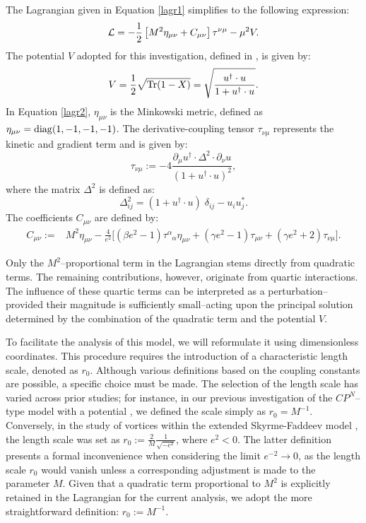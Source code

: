 \documentclass[aps,prd,superscriptaddress,notitlepage,11pt,final,longbibliography,nofootinbib]{revtex4-1}
\newcommand{\be}{\begin{equation}}
\newcommand{\ee}{\end{equation}}
\numberwithin{equation}{section}
\begin{document}
The Lagrangian given in Equation \eqref{lagr1} simplifies to the following expression:
\be
{\cal L}=-\frac{1}{2}\left[M^2\eta_{\mu\nu}+C_{\mu\nu}\right]\tau^{\nu\mu}-\mu^2V.\label{lagr2}
\ee
The potential $V$ adopted for this investigation, defined in \cite{Klimas:2017eft}, is given by:
\be
V=\frac{1}{2}\sqrt{{\rm Tr}(1-X)}=\sqrt{\frac{u^{\dagger}\cdot u}{1+u^{\dagger}\cdot u}}.\label{potencjal}
\ee
In Equation \eqref{lagr2}, $\eta_{\mu\nu}$ is the Minkowski metric, defined as $\eta_{\mu\nu}={\rm diag}(1,-1,-1,-1)$. The derivative-coupling tensor $\tau_{\nu\mu}$ represents the kinetic and gradient term and is given by:
\be
\tau_{\nu\mu}:=-4\frac{\partial_{\mu}u^{\dagger}\cdot\Delta^2\cdot\partial_{\nu}u}{(1+u^{\dagger}\cdot u)^2},\label{tau}
\ee
where the matrix $\Delta^2$ is defined as:
\[
\Delta^2_{ij}=(1+u^{\dagger} \cdot u)\;\delta_{ij}-u_iu^*_j.
\]
The coefficients $C_{\mu\nu}$ are defined by:
\begin{align}
C_{\mu\nu}:=&M^2\eta_{\mu\nu}-\frac{4}{e^2}\Big[(\beta e^2-1)\tau^{\alpha}_{\,\,\,\,\alpha}\eta_{\mu\nu}+(\gamma e^2-1)\tau_{\mu\nu}+(\gamma e^2+2)\tau_{\nu\mu}\Big].
\end{align}

Only the $M^2$--proportional term in the Lagrangian stems directly from quadratic terms. The remaining contributions, however, originate from quartic interactions. The influence of these quartic terms can be interpreted as a perturbation--provided their magnitude is sufficiently small--acting upon the principal solution determined by the combination of the quadratic term and the potential $V$.

To facilitate the analysis of this model, we will reformulate it using dimensionless coordinates. This procedure requires the introduction of a characteristic length scale, denoted as $r_0$. Although various definitions based on the coupling constants are possible, a specific choice must be made. The selection of the length scale has varied across prior studies; for instance, in our previous investigation of the $CP^N$--type model with a potential \cite{Klimas:2017eft}, we defined the scale simply as $r_0=M^{-1}$. Conversely, in the study of vortices within the extended Skyrme-Faddeev model \cite{Amari:2015sva}, the length scale was set as $r_0:=\frac{2}{M}\frac{1}{\sqrt{-e^{2}}}$, where $e^2<0$. The latter definition presents a formal inconvenience when considering the limit $e^{-2}\to 0$, as the length scale $r_0$ would vanish unless a corresponding adjustment is made to the parameter $M$. Given that a quadratic term proportional to $M^2$ is explicitly retained in the Lagrangian for the current analysis, we adopt the more straightforward definition: $r_0:=M^{-1}$.
\end{document}
